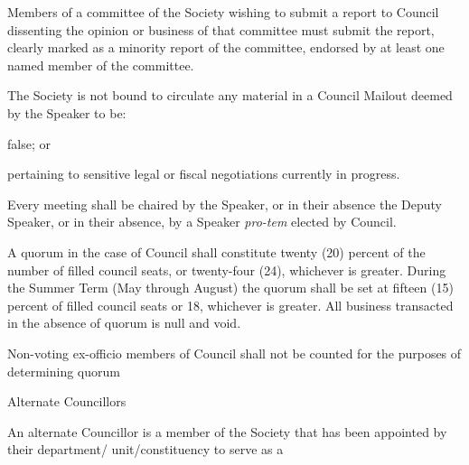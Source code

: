 \begin{longenum}[ label*=\thesubsection.\arabic*., align=left]
\begin{longenum}[ label*=\arabic*., align=left]
        \item Members of a committee of the Society wishing to submit a report to Council dissenting the opinion or business of that committee must submit the report, clearly marked as a minority report of the committee, endorsed by at least one named member of the committee. 
	\end{longenum}
    \item The Society is not bound to circulate any material in a Council Mailout deemed by the Speaker to be:
    \begin{longenum}[ label*=\arabic*., align=left]
		\item false; or
        \item pertaining to sensitive legal or fiscal negotiations currently in progress.
	\end{longenum}
    \item Every meeting shall be chaired by the Speaker, or in their absence the Deputy Speaker, or in their absence, by a Speaker \textit{pro-tem} elected by Council.
    \item A quorum in the case of Council shall constitute twenty (20) percent of the number of filled council seats, or twenty-four (24), whichever is greater. During the Summer Term (May through August) the quorum shall be set at fifteen (15) percent of filled council seats or 18, whichever is greater. All business transacted in the absence of quorum is null and void.
    \item Non-voting ex-officio members of Council shall not be counted for the purposes of determining quorum
    \item Alternate Councillors
    \begin{longenum}[ label*=\arabic*., align=left]
		\item An alternate Councillor is a member of the Society that has been appointed by their department/ unit/constituency to serve as a
		\begin{itemize}

\end{itemize}
\end{longenum}
\end{longenum}
